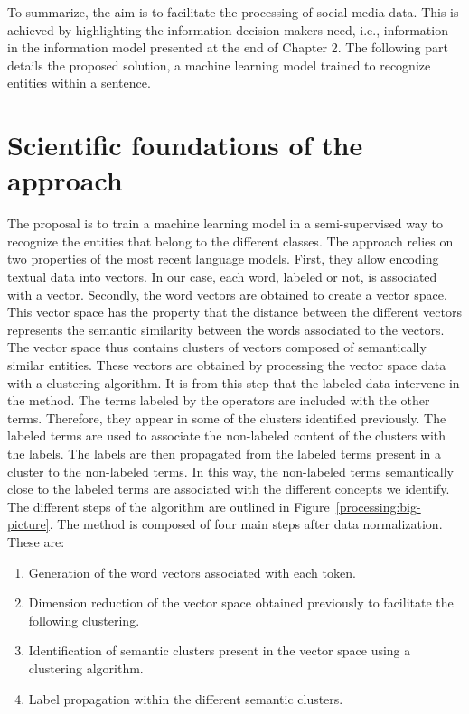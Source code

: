 To summarize, the aim is to facilitate the processing of social media data.
This is achieved by highlighting the information decision-makers need, i.e., information in the information model presented at the end of Chapter 2.
The following part details the proposed solution, a machine learning model trained to recognize entities within a sentence.

\section{Scientific foundations of the approach}
The proposal is to train a machine learning model in a semi-supervised way to recognize the entities that belong to the different classes.
The approach relies on two properties of the most recent language models.
First, they allow encoding textual data into vectors.
In our case, each word, labeled or not, is associated with a vector.
Secondly, the word vectors are obtained to create a vector space.
This vector space has the property that the distance between the different vectors represents the semantic similarity between the words associated to the vectors.
The vector space thus contains clusters of vectors composed of semantically similar entities.
These vectors are obtained by processing the vector space data with a clustering algorithm.
It is from this step that the labeled data intervene in the method.
The terms labeled by the operators are included with the other terms.
Therefore, they appear in some of the clusters identified previously.
The labeled terms are used to associate the non-labeled content of the clusters with the labels.
The labels are then propagated from the labeled terms present in a cluster to the non-labeled terms.
In this way, the non-labeled terms semantically close to the labeled terms are associated with the different concepts we identify.
The different steps of the algorithm are outlined in Figure~\ref{processing:big-picture}.
The method is composed of four main steps after data normalization.
These are:

\begin{enumerate}
    \item Generation of the word vectors associated with each token.
    \item Dimension reduction of the vector space obtained previously to facilitate the following clustering.
    \item Identification of semantic clusters present in the vector space using a clustering algorithm.
    \item Label propagation within the different semantic clusters.
\end{enumerate}


